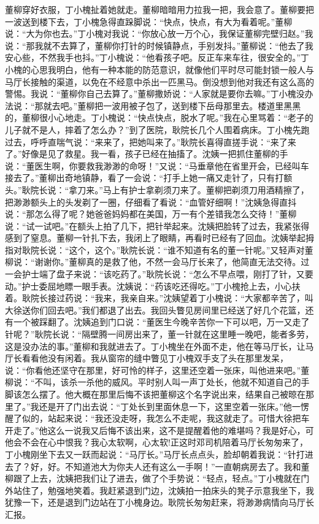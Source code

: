 \documentclass[12pt,oneside]{book}
\begin{document}
董柳穿好衣服，丁小槐扯着她就走。董柳暗暗用力拉我一把，我会意了。董柳要把一波送到楼下去，丁小槐急得直跺脚说：``快点，快点，有大为看着呢。''董柳说：``大为你也去。''丁小槐对我说：``你放心放一万个心，我保证董柳完壁归赵。''我说：``那我就不去算了，董柳你打针的时候镇静点，手别发抖。''董柳说：``他去了我安心些，不然我手也抖。''丁小槐说：``他看孩子吧。反正车来车往，很安全的。''丁小槐的心思我明白，他有一种本能的防范意识，就像他们平时尽可能封锁一般人与马厅长接触的渠道，以免在不经意中杀出一匹黑马。倒没想到他对我还有这么高的警惕。我说：``董柳你自己去算了。''董柳撒娇说：``人家就是要你去嘛。''丁小槐没办法说：``那就去吧。''董柳把一波用被子包了，送到楼下岳母那里去。楼道里黑黑的，董柳很小心地走。丁小槐说：``快点快点，脱水了呢。''我在心里骂着：``老子的儿子就不是人，摔着了怎么办？''到了医院，耿院长几个人围着病床。丁小槐先跑过去，呼呼直喘气说：``来来了，把她叫来了。''耿院长喜得直搓手说：``来了来了。''好像是见了救星。我一看，孩子已经在抽搐了。沈姨一把抓住董柳的手说：``董医生啊，你要救我渺渺的命呀！''又说：``马垂章他在省里开会，已经叫车接去了。''董柳出奇地镇静，看了一会说：``打手上她一痛又走针了，只有打额头。''耿院长说：``拿刀来。''马上有护士拿剃须刀来了。董柳把剃须刀用酒精擦了，把渺渺额头上的头发剃了一圈，仔细看了看说：``血管好细啊！''沈姨急得直抖说：``那怎么得了呢？她爸爸妈妈都在美国，万一有个差错我怎么交待！''董柳说：``试一试吧。''在额头上拍了几下，把针举起来。沈姨把脸转了过去，我紧张得感到了窒息。董柳一针扎下去，我闭上了眼睛，再看时已经有了回血。沈姨举起拇指对耿院长说：``这个，这个。''耿院长说：``谁不知道有名的董一针呢。''又轻声对董柳说：``谢谢你。''董柳真的是救了他，不然一会马厅长来了，他简直无法交待。过一会护士端了盘子来说：``该吃药了。''耿院长说：``怎么不早点喂，刚打了针，又要动。''护士委屈地瞟一眼手表。沈姨说：``药该吃还得吃。''丁小槐抢上去，小心扶着。耿院长接过药说：``我来，我亲自来。''沈姨望着丁小槐说：``大家都辛苦了，叫大徐送你们回去吧。''我们都退了出去。我回头瞥见房间里已经送了好几个花篮，还有一个被踩翻了。沈姨追到门口说：``董医生今晚辛苦你一下可以吧，万一又走了针呢？''耿院长说：``隔壁腾一间房出来了，董一针就在这里睡一晚吧，能者多劳，这是没办法的事。''董柳和我就进去了。丁小槐坐在外面不走，他在等马厅长，让马厅长看看他没有闲着。我从窗帘的缝中瞥见丁小槐双手支了头在那里发呆，说：``你看他还坚守在那里，好可怜的样子，这里还空着一张床，叫他进来吧。''董柳说：``不叫，该杀一杀他的威风。平时别人叫一声丁处长，他就不知道自己的手脚该怎么摆了。他大概在那里后悔不该把董柳这个名字说出来，结果自己被晾在那里了。''我还是开了门出去说：``丁处长到里面休息一下，这里空着一张床。''他一愣醒了似的，站起来说：``我还没走呀，我怎么不走呢，我这就走了。可惜大徐把车开走了。''他这么一说我又后悔不该出来，这不是提醒着他的难堪吗？我是好心，可他会不会在心中恨我？我心太软啊，心太软!正这时邓司机陪着马厅长匆匆来了，丁小槐刚坐下去又一跃而起说：``马厅长。''马厅长点点头，脸却朝着我说：``针打进去了？好，好。不知道池大为你夫人还有这么一手啊！''一直朝病房去了。我和董柳跟了上去，沈姨把我们让了进去，做了个手势说：``轻点，轻点。''丁小槐就在门外站住了，勉强地笑着。我赶紧退到门边，沈姨拍一拍床头的凳子示意我坐下，我犹豫一下，还是退到门边站在丁小槐身边。耿院长匆匆赶来，将渺渺病情向马厅长汇报。
\end{document}
